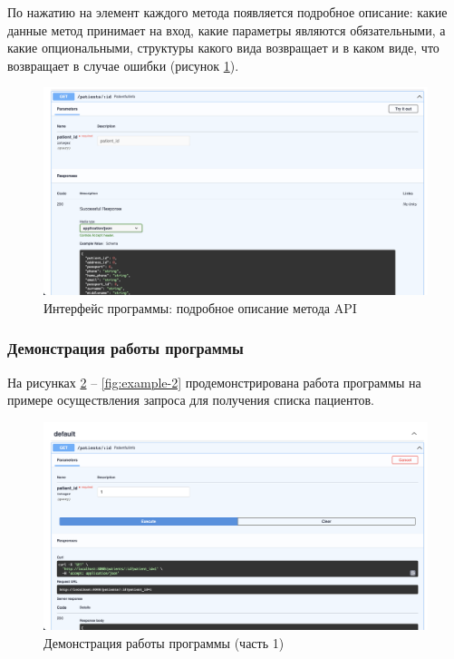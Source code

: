 По нажатию на элемент каждого метода появляется подробное описание: какие данные метод принимает на вход, какие параметры являются обязательными, а какие опциональными, структуры какого вида возвращает и в каком виде, что возвращает в случае ошибки (рисунок \ref{fig:interface-2}).
\begin{figure}[h]
	\centering
	\captionsetup{justification=centering}
	\includegraphics[width=170mm]{img/interface-2.png}
	\caption{Интерфейс программы: подробное описание метода API}
	\label{fig:interface-2}
\end{figure}


\subsubsection{Демонстрация работы программы}

На рисунках \ref{fig:example-1} -- \ref{fig:example-2} продемонстрирована работа программы на примере осуществления запроса для получения списка пациентов.

\begin{figure}[h]
	\centering
	\captionsetup{justification=centering}
	\includegraphics[width=140mm]{img/example-1.png}
	\caption{Демонстрация  работы  программы  (часть 1)}
	\label{fig:example-1}
\end{figure}

